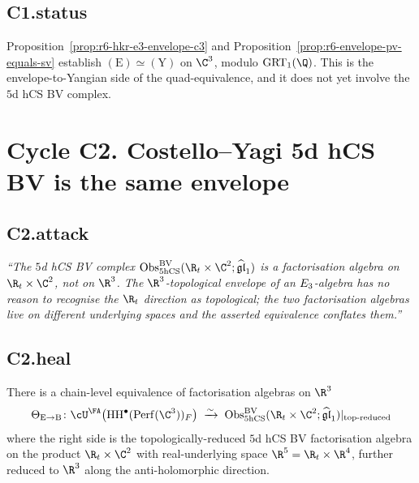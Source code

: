 \subsection*{C1.status}

Proposition~\ref{prop:r6-hkr-e3-envelope-c3} and
Proposition~\ref{prop:r6-envelope-pv-equals-sv} establish
$(\mathrm E)\simeq(\mathrm Y)$ on $\C^3$, modulo $\GRT_1(\Q)$. This
is the envelope-to-Yangian side of the quad-equivalence, and it does
not yet involve the $5$d hCS BV complex.

\section*{Cycle C2. Costello--Yagi 5d hCS BV is the same envelope}

\subsection*{C2.attack}

\emph{``The $5$d hCS BV complex
$\Obs^{\BV}_{5\hCS}(\R_t\times\C^2;\ghat)$ is a factorisation algebra
on $\R_t\times\C^2$, not on $\R^3$. The $\R^3$-topological envelope of
an $E_3$-algebra has no reason to recognise the $\R_t$ direction as
topological; the two factorisation algebras live on different underlying
spaces and the asserted equivalence conflates them.''}

\subsection*{C2.heal}

\begin{proposition}
\label{prop:r6-top-rt-reduction-5d-hcs}
There is a chain-level equivalence of factorisation algebras on $\R^3$
\[
\Theta_{\mathrm E\to\mathrm B}\colon
\cU^\FA\bigl(\HH^\bullet(\Perf(\C^3))_F\bigr)
\;\xrightarrow{\sim}\;
\Obs^{\BV}_{5\hCS}(\R_t\times\C^2;\ghat)|_{\text{top-reduced}}
\]
where the right side is the topologically-reduced $5$d hCS BV
factorisation algebra on the product $\R_t\times\C^2$ with
real-underlying space $\R^5 = \R_t\times\R^4$, further reduced to
$\R^3$ along the anti-holomorphic direction.
\end{proposition}

